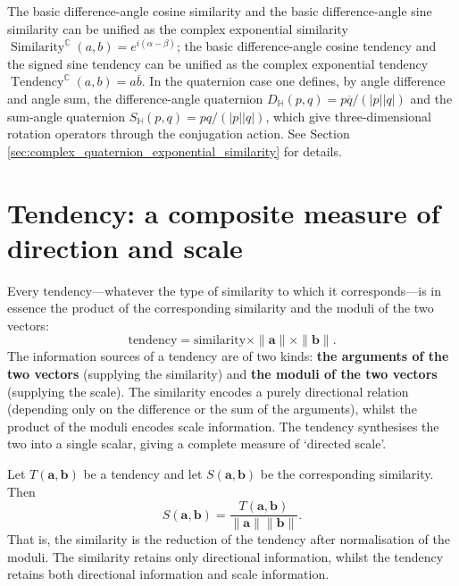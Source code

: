 \begin{remark}\label{rem:exponential_packaging}
The basic difference-angle cosine similarity and the basic difference-angle sine similarity can be unified as the complex exponential similarity
$\operatorname{Similarity}^{\mathbb C}(a,b)=e^{i(\alpha-\beta)}$;
the basic difference-angle cosine tendency and the signed sine tendency can be unified as the complex exponential tendency
$\operatorname{Tendency}^{\mathbb C}(a,b)=a\overline b$.
In the quaternion case one defines, by angle difference and angle sum, the difference-angle quaternion
$D_{\mathbb H}(p,q)=p\overline q/(|p||q|)$
and the sum-angle quaternion
$S_{\mathbb H}(p,q)=pq/(|p||q|)$,
which give three-dimensional rotation operators through the conjugation action. See Section \ref{sec:complex_quaternion_exponential_similarity} for details.
\end{remark}
\section{\texorpdfstring{Tendency: a composite measure of direction and scale}{Tendency: a composite measure of direction and scale}}

\begin{definition}\label{def:tendency_root}
Every tendency---whatever the type of similarity to which it corresponds---is in essence the product of the corresponding similarity and the moduli of the two vectors:
\[
\text{tendency} = \text{similarity} \times \|\mathbf{a}\| \times \|\mathbf{b}\|.
\]
The information sources of a tendency are of two kinds: \textbf{the arguments of the two vectors} (supplying the similarity) and \textbf{the moduli of the two vectors} (supplying the scale). The similarity encodes a purely directional relation (depending only on the difference or the sum of the arguments), whilst the product of the moduli encodes scale information. The tendency synthesises the two into a single scalar, giving a complete measure of `directed scale'.
\end{definition}

\begin{proposition}\label{prop:similarity_reduction}
Let $T(\mathbf{a},\mathbf{b})$ be a tendency and let $S(\mathbf{a},\mathbf{b})$ be the corresponding similarity. Then
\[
S(\mathbf{a},\mathbf{b}) = \frac{T(\mathbf{a},\mathbf{b})}{\|\mathbf{a}\| \|\mathbf{b}\|}.
\]
That is, the similarity is the reduction of the tendency after normalisation of the moduli. The similarity retains only directional information, whilst the tendency retains both directional information and scale information.
\end{proposition}

